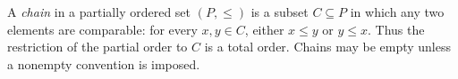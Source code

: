 
A \emph{chain} in a partially ordered set $(P,\le)$ is a subset $C\subseteq P$ in which any two elements are comparable: for every $x,y\in C$, either $x\le y$ or $y\le x$. Thus the restriction of the partial order to $C$ is a total order. Chains may be empty unless a nonempty convention is imposed.
